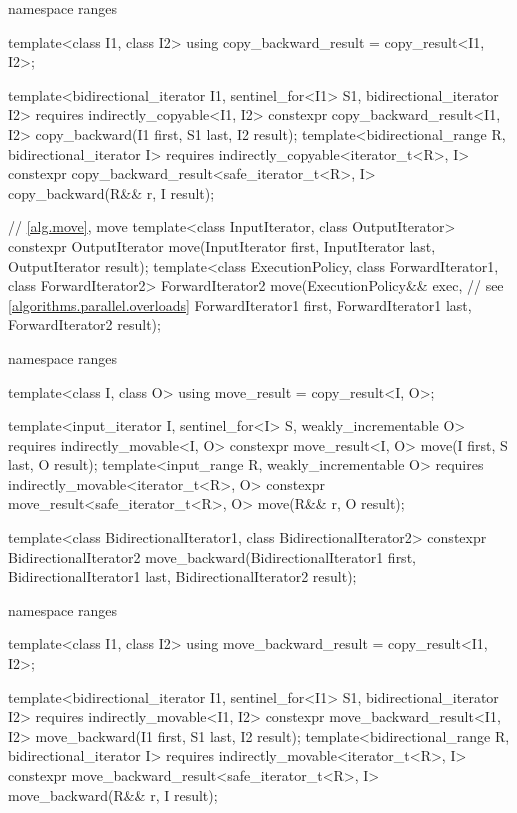 \begin{codeblock}
{  namespace ranges {
    template<class I1, class I2>
    using copy_backward_result = copy_result<I1, I2>;

    template<bidirectional_iterator I1, sentinel_for<I1> S1, bidirectional_iterator I2>
      requires indirectly_copyable<I1, I2>
      constexpr copy_backward_result<I1, I2>
        copy_backward(I1 first, S1 last, I2 result);
    template<bidirectional_range R, bidirectional_iterator I>
      requires indirectly_copyable<iterator_t<R>, I>
      constexpr copy_backward_result<safe_iterator_t<R>, I>
        copy_backward(R&& r, I result);
  }

  // \ref{alg.move}, move
  template<class InputIterator, class OutputIterator>
    constexpr OutputIterator move(InputIterator first, InputIterator last,
                                  OutputIterator result);
  template<class ExecutionPolicy, class ForwardIterator1,
           class ForwardIterator2>
    ForwardIterator2 move(ExecutionPolicy&& exec,               // see \ref{algorithms.parallel.overloads}
                          ForwardIterator1 first, ForwardIterator1 last,
                          ForwardIterator2 result);

  namespace ranges {
    template<class I, class O>
    using move_result = copy_result<I, O>;

    template<input_iterator I, sentinel_for<I> S, weakly_incrementable O>
      requires indirectly_movable<I, O>
      constexpr move_result<I, O>
        move(I first, S last, O result);
    template<input_range R, weakly_incrementable O>
      requires indirectly_movable<iterator_t<R>, O>
      constexpr move_result<safe_iterator_t<R>, O>
        move(R&& r, O result);
  }

  template<class BidirectionalIterator1, class BidirectionalIterator2>
    constexpr BidirectionalIterator2
      move_backward(BidirectionalIterator1 first, BidirectionalIterator1 last,
                    BidirectionalIterator2 result);

  namespace ranges {
    template<class I1, class I2>
    using move_backward_result = copy_result<I1, I2>;

    template<bidirectional_iterator I1, sentinel_for<I1> S1, bidirectional_iterator I2>
      requires indirectly_movable<I1, I2>
      constexpr move_backward_result<I1, I2>
        move_backward(I1 first, S1 last, I2 result);
    template<bidirectional_range R, bidirectional_iterator I>
      requires indirectly_movable<iterator_t<R>, I>
      constexpr move_backward_result<safe_iterator_t<R>, I>
        move_backward(R&& r, I result);
  }

}
\end{codeblock}
